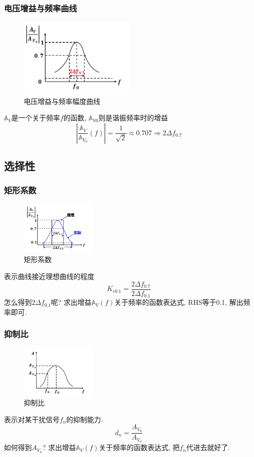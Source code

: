 \documentclass[a4paper]{report}
\begin{document}
\subsubsection{电压增益与频率曲线}
\begin{figure}[H]
\centering
\includegraphics[width=0.5\textwidth]{amp_small_graph_1.png}
\caption{电压增益与频率幅度曲线}
\end{figure}
$\mathbb{A}_V$是一个关于频率$f$的函数, $\mathbb{A}_{V0}$则是谐振频率时的增益
$$|\frac{\mathbb{A}_V}{\mathbb{A}_{V_0}}(f)|=\frac{1}{\sqrt{2}}\approx 0.707\Rightarrow 2\Delta f_{0.7}$$

\subsection{选择性}
\subsubsection{矩形系数}
\begin{figure}[H]
\centering
\includegraphics[width=0.33\textwidth]{amp_small_graph_2.png}
\caption{矩形系数}
\end{figure}
表示曲线接近理想曲线的程度
$$K_{r0.1}=\frac{2\Delta f_{0.7}}{2\Delta f_{0.1}}$$
怎么得到$2\Delta f_{0.1}$呢? 求出增益$\mathbb{A}_V(f)$关于频率的函数表达式, RHS等于0.1, 解出频率即可. 
\subsubsection{抑制比}
\begin{figure}[H]
\centering
\includegraphics[width=0.33\textwidth]{amp_small_graph_3.png}
\caption{抑制比}
\end{figure}
表示对某干扰信号$f_n$的抑制能力. 
$$d_n=\frac{A_{V_0}}{A_{V_n}}$$
如何得到$A_{V_n}$? 求出增益$\mathbb{A}_V(f)$关于频率的函数表达式, 把$f_n$代进去就好了. 
\end{document}
